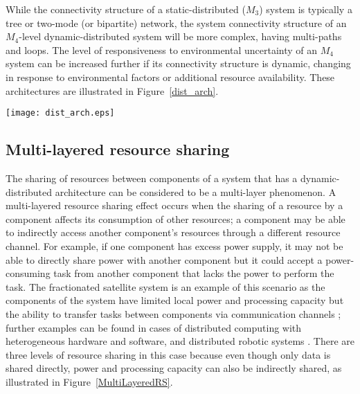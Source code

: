 \documentclass[journal,onecolumn]{IEEEtran}
\theoremstyle{plain}
\begin{document}
While the connectivity structure of a static-distributed ($M_3$) system is typically a tree or two-mode (or bipartite) network, the system connectivity structure of an $M_4$-level dynamic-distributed system will be more complex, having multi-paths and loops. The level of responsiveness to environmental uncertainty of an $M_4$ system can be increased further if its connectivity structure is dynamic, changing in response to environmental factors or additional resource availability. These architectures are illustrated in Figure~\ref{dist_arch}.

\begin{figure*}[!t]
\centering
\texttt{[image: dist\_arch.eps]}
\caption{Connectivity structure of distributed systems with different levels of flexibility (solid lines represent static connections and dotted lines represent dynamic connections; nodes with solid colors denote fixed roles (client/server) and nodes with gradient color denote components with dynamic roles) (a) Resource allocation and the design of the connectivity structure are centralized ($M_3$). (b) Resource sharing is decentralized but the connectivity structure is static and designed centrally ($M_4$). (c) Resource sharing is decentralized and connectivity structure is dynamic and formed by distributed components ($M_4$). }
\label{dist_arch}
\end{figure*}



\subsection{Multi-layered resource sharing}
The sharing of resources between components of a system that has a dynamic-distributed architecture can be considered to be a multi-layer phenomenon. A multi-layered resource sharing effect occurs when the sharing of a resource by a component affects its consumption of other resources; a component may be able to indirectly access another component's resources through a different resource channel. For example, if one component has excess power supply, it may not be able to directly share power with another component but it could accept a power-consuming task from another component that lacks the power to perform the task. The fractionated satellite system is an example of this scenario as the components of the system have limited local power and processing capacity but the ability to transfer tasks between components via communication channels \citep{brown2009value, mosleh2014optimal}; further examples can be found in cases of distributed computing with heterogeneous hardware and software, and distributed robotic systems \citep{roberts1970computer, wang1994resource}. There are three levels of resource sharing in this case because even though  only data is shared directly, power and processing capacity can also be indirectly shared, as illustrated in Figure~\ref{MultiLayeredRS}. 
\end{document}
